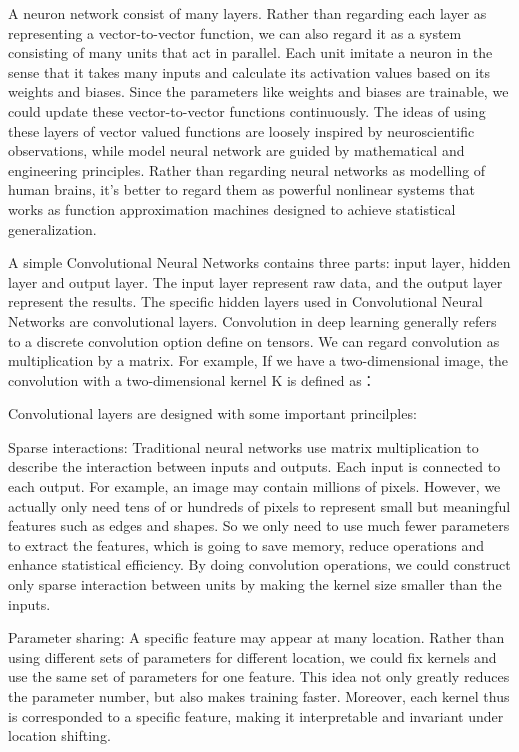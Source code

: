 A neuron network consist of many layers. Rather than regarding each layer as representing a vector-to-vector function, we can also regard it as a system consisting of many units that act in parallel. Each unit imitate a neuron in the sense that it takes many inputs and calculate its activation values based on its weights and biases. Since the parameters like weights and biases are trainable, we could update these vector-to-vector functions continuously. The ideas of using these layers of vector valued functions are loosely inspired by neuroscientific observations, while model neural network are guided by mathematical and engineering principles. Rather than regarding neural networks as modelling of human brains, it’s better to regard them as powerful nonlinear systems that works as function approximation machines designed to achieve statistical generalization.

A simple Convolutional Neural Networks contains three parts: input layer, hidden layer and output layer. The input layer represent raw data, and the output layer represent the results. The specific hidden layers used in Convolutional Neural Networks are convolutional layers. Convolution in deep learning generally refers to a discrete convolution option define on tensors. We can regard convolution as multiplication by a matrix. For example, If we have a two-dimensional image, the convolution with a two-dimensional kernel K is defined as：

Convolutional layers are designed with some important princilples: 

Sparse interactions: Traditional neural networks use matrix multiplication to describe the interaction between inputs and outputs. Each input is connected to each output. For example, an image may contain millions of pixels. However, we actually only need tens of or hundreds of pixels to represent small but meaningful features such as edges and shapes. So we only need to use much fewer parameters to extract the features, which is going to save memory, reduce operations and enhance statistical efficiency. By doing convolution operations, we could construct only sparse interaction between units by making the kernel size smaller than the inputs.

Parameter sharing: A specific feature may appear at many location. Rather than using different sets of parameters for different location, we could fix kernels and use the same set of parameters for one feature. This idea not only greatly reduces the parameter number, but also makes training faster. Moreover, each kernel thus is corresponded to a specific feature, making it interpretable and invariant under location shifting.

